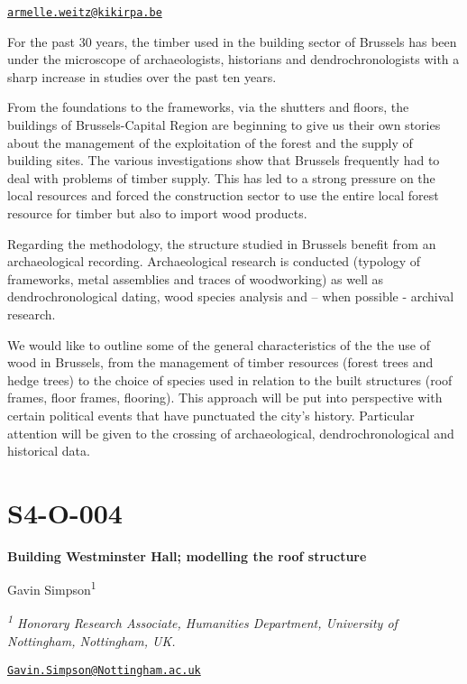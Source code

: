 \documentclass[
]{book}
\begin{document}
\href{mailto:armelle.weitz@kikirpa.be}{\nolinkurl{armelle.weitz@kikirpa.be}}

For the past 30 years, the timber used in the building sector of Brussels has been under the microscope of archaeologists, historians and dendrochronologists with a sharp increase in studies over the past ten years.

From the foundations to the frameworks, via the shutters and floors, the buildings of Brussels-Capital Region are beginning to give us their own stories about the management of the exploitation of the forest and the supply of building sites. The various investigations show that Brussels frequently had to deal with problems of timber supply. This has led to a strong pressure on the local resources and forced the construction sector to use the entire local forest resource for timber but also to import wood products.

Regarding the methodology, the structure studied in Brussels benefit from an archaeological recording. Archaeological research is conducted (typology of frameworks, metal assemblies and traces of woodworking) as well as dendrochronological dating, wood species analysis and -- when possible - archival research.

We would like to outline some of the general characteristics of the the use of wood in Brussels, from the management of timber resources (forest trees and hedge trees) to the choice of species used in relation to the built structures (roof frames, floor frames, flooring). This approach will be put into perspective with certain political events that have punctuated the city's history. Particular attention will be given to the crossing of archaeological, dendrochronological and historical data.

\hypertarget{s4-o-004}{%
\section*{S4-O-004}\label{s4-o-004}}

\textbf{Building Westminster Hall; modelling the roof structure}

Gavin Simpson\textsuperscript{1}

\emph{\textsuperscript{1} Honorary Research Associate, Humanities Department, University of Nottingham, Nottingham, UK.}

\href{mailto:Gavin.Simpson@Nottingham.ac.uk}{\nolinkurl{Gavin.Simpson@Nottingham.ac.uk}}
\end{document}

